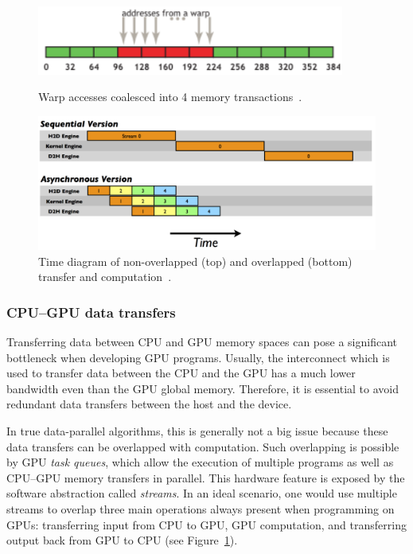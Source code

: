 \begin{figure}[b]
	\centering
	\begin{minipage}{.5\textwidth}
        \centering
        \includegraphics[width=0.9\textwidth]{img/coal1}
        \caption{Warp accesses coalesced into 4 memory transactions~\cite{site:cuda}.}
        \label{fig:coal}
	\end{minipage}%
	\begin{minipage}{.5\textwidth}
        \centering
        \includegraphics[width=\textwidth]{img/C2050Timeline-1024x670.png}
        \caption{Time diagram of non-overlapped (top) and overlapped (bottom) transfer and computation~\cite{site:stream}.}
        \label{fig:transfer}
	\end{minipage}
\end{figure}

\subsubsection{CPU--GPU data transfers}
\label{sec:transfers}

Transferring data between CPU and GPU memory spaces can pose a significant bottleneck when developing GPU programs. Usually, the interconnect which is used to transfer data between the CPU and the GPU has a much lower bandwidth even than the GPU global memory. Therefore, it is essential to avoid redundant data transfers between the host and the device.

In true data-parallel algorithms, this is generally not a big issue because these data transfers can be overlapped with computation. Such overlapping is possible by GPU \emph{task queues}, which allow the execution of multiple programs as well as CPU--GPU memory transfers in parallel. This hardware feature is exposed by the software abstraction called \emph{streams}. In an ideal scenario, one would use multiple streams to overlap three main operations always present when programming on GPUs: transferring input from CPU to GPU, GPU computation, and transferring output back from GPU to CPU (see Figure~\ref{fig:transfer}).

